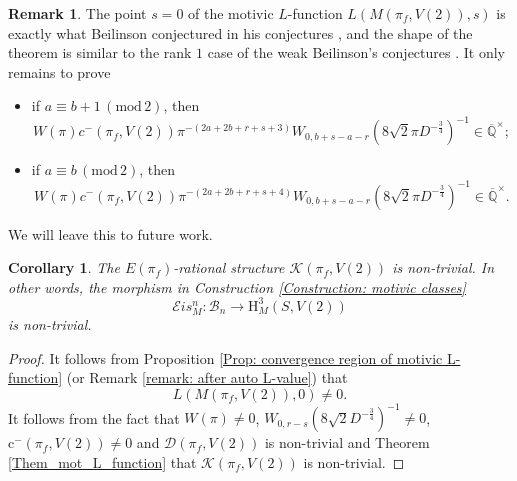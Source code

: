 \documentclass[11pt, a4paper]{amsart}
\theoremstyle{plain}
\newtheorem{corollary}[theorem]{Corollary}
\theoremstyle{definition}
\newtheorem{remark}[theorem]{Remark}
\numberwithin{equation}{section}
\def\QQ{\mathbb{Q}}
\begin{document}
\begin{remark}
    The point $s = 0$ of the motivic $L$-function $L(M(\pi_f, V(2)), s)$ is exactly what Beilinson conjectured in his conjectures \textnormal{\cite[Conjecture (6.1)]{Nekovar94}}, and the shape of the theorem is similar to the rank $1$ case of the weak Beilinson's conjectures \cite[(6.6)]{Nekovar94}. It only remains to prove 
    \begin{itemize}
        \item if $a \equiv b + 1\, (\mathrm{mod} \, 2)$, then
        \begin{equation*}
            W(\pi)  c^{-}(\pi_f, V(2)) \pi^{-(2a + 2b + r + s + 3)} W_{0, b + s - a - r}(8\sqrt{2}\pi D^{-\frac{3}{4}})^{-1} \in \overline{\QQ}^{\times};
        \end{equation*}
        \item if $a \equiv b \, (\mathrm{mod} \, 2)$, then 
        \begin{equation*}
            W(\pi)  c^{-}(\pi_f, V(2)) \pi^{-(2a + 2b + r + s + 4)} W_{0, b + s - a - r}(8\sqrt{2}\pi D^{-\frac{3}{4}})^{-1}  \in \overline{\QQ}^{\times}.
        \end{equation*}
    \end{itemize}
    We will leave this to future work. 
\end{remark}

\begin{corollary}
\label{corollary: nontrivial_class}
        The $E(\pi_f)$-rational structure $\mathcal{K}(\pi_f, V(2))$ is non-trivial. In other words, the morphism in Construction \ref{Construction: motivic classes}
              \begin{equation*}
                  \mathcal{E}is_{M}^{n} \colon \mathcal{B}_{n} \rightarrow \mathrm{H}_{M}^{3}(S, V(2))
              \end{equation*}
        is non-trivial.
\end{corollary}

\begin{proof}
        It follows from Proposition \ref{Prop: convergence region of motivic L-function} (or Remark \ref{remark: after auto L-value}) that 
        \begin{equation*}
            L(M(\pi_f, V(2)), 0) \neq 0. 
        \end{equation*}
        It follows from the fact that $W(\pi) \neq 0$, $ W_{0,r-s}(8\sqrt{2}D^{-\frac{3}{4}})^{-1} \neq 0$, $\mathrm{c}^{-}(\pi_f,V(2)) \neq 0$ and $\mathcal{D}(\pi_f, V(2))$ is non-trivial and Theorem \ref{Them_mot_L_function} that $\mathcal{K}(\pi_f,V(2))$ is non-trivial.
\end{proof}
\end{document}
